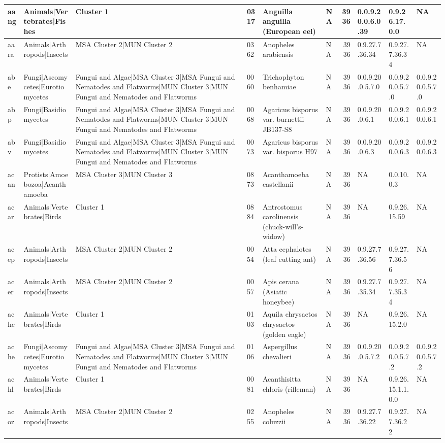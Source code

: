\documentclass[
  letterpaper,
  DIV=11,
  numbers=noendperiod]{scrreprt}
\begin{document}
\begin{tabular}{l|l|l|l|l|l|r|l|l|l}
\hline
aang & Animals|Vertebrates|Fishes & Cluster 1 & 0317 & Anguilla anguilla (European eel) & NA & 3936 & 0.0.9.20.0.6.0.39 & 0.9.26.17.0.0 & NA\\
\hline
aara & Animals|Arthropods|Insects & MSA Cluster 2|MUN Cluster 2 & 0362 & Anopheles arabiensis & NA & 3936 & 0.9.27.7.36.34 & 0.9.27.7.36.34 & NA\\
\hline
abe & Fungi|Ascomycetes|Eurotiomycetes & Fungui and Algae|MSA Cluster 3|MSA Fungui and Nematodes and Flatworms|MUN Cluster 3|MUN Fungui and Nematodes and Flatworms & 0060 & Trichophyton benhamiae & NA & 3936 & 0.0.9.20.0.5.7.0 & 0.0.9.20.0.5.7.0 & 0.0.9.20.0.5.7.0\\
\hline
abp & Fungi|Basidiomycetes & Fungui and Algae|MSA Cluster 3|MSA Fungui and Nematodes and Flatworms|MUN Cluster 3|MUN Fungui and Nematodes and Flatworms & 0068 & Agaricus bisporus var. burnettii JB137-S8 & NA & 3936 & 0.0.9.20.0.6.1 & 0.0.9.20.0.6.1 & 0.0.9.20.0.6.1\\
\hline
abv & Fungi|Basidiomycetes & Fungui and Algae|MSA Cluster 3|MSA Fungui and Nematodes and Flatworms|MUN Cluster 3|MUN Fungui and Nematodes and Flatworms & 0073 & Agaricus bisporus var. bisporus H97 & NA & 3936 & 0.0.9.20.0.6.3 & 0.0.9.20.0.6.3 & 0.0.9.20.0.6.3\\
\hline
acan & Protists|Amoebozoa|Acanthamoeba & MSA Cluster 3|MUN Cluster 3 & 0873 & Acanthamoeba castellanii & NA & 3936 & NA & 0.0.10.0.3 & NA\\
\hline
acar & Animals|Vertebrates|Birds & Cluster 1 & 0884 & Antrostomus carolinensis (chuck-will's-widow) & NA & 3936 & NA & 0.9.26.15.59 & NA\\
\hline
acep & Animals|Arthropods|Insects & MSA Cluster 2|MUN Cluster 2 & 0054 & Atta cephalotes (leaf cutting ant) & NA & 3936 & 0.9.27.7.36.56 & 0.9.27.7.36.56 & NA\\
\hline
acer & Animals|Arthropods|Insects & MSA Cluster 2|MUN Cluster 2 & 0057 & Apis cerana (Asiatic honeybee) & NA & 3936 & 0.9.27.7.35.34 & 0.9.27.7.35.34 & NA\\
\hline
achc & Animals|Vertebrates|Birds & Cluster 1 & 0103 & Aquila chrysaetos chrysaetos (golden eagle) & NA & 3936 & NA & 0.9.26.15.2.0 & NA\\
\hline
ache & Fungi|Ascomycetes|Eurotiomycetes & Fungui and Algae|MSA Cluster 3|MSA Fungui and Nematodes and Flatworms|MUN Cluster 3|MUN Fungui and Nematodes and Flatworms & 0106 & Aspergillus chevalieri & NA & 3936 & 0.0.9.20.0.5.7.2 & 0.0.9.20.0.5.7.2 & 0.0.9.20.0.5.7.2\\
\hline
achl & Animals|Vertebrates|Birds & Cluster 1 & 0081 & Acanthisitta chloris (rifleman) & NA & 3936 & NA & 0.9.26.15.1.1.0.0 & NA\\
\hline
acoz & Animals|Arthropods|Insects & MSA Cluster 2|MUN Cluster 2 & 0255 & Anopheles coluzzii & NA & 3936 & 0.9.27.7.36.22 & 0.9.27.7.36.22 & NA\\
\hline
\end{tabular}
\end{document}
